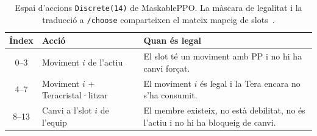 \begin{table}[htbp]
\centering
\caption{Espai d'accions \texttt{Discrete(14)} de MaskablePPO. La màscara de legalitat i la traducció a \texttt{/choose} comparteixen el mateix mapeig de slots~\cite{huang_action_masking}.}
\label{tab:ppo_actions}
\small
\begin{tabularx}{\textwidth}{clX}
\toprule
\textbf{Índex} & \textbf{Acció} & \textbf{Quan és legal} \\
\midrule
0--3 & Moviment $i$ de l'actiu & El slot té un moviment amb PP i no hi ha canvi forçat. \\
4--7 & Moviment $i$ + Teracristal·litzar & El moviment $i$ és legal i la Tera encara no s'ha consumit. \\
8--13 & Canvi a l'slot $i$ de l'equip & El membre existeix, no està debilitat, no és l'actiu i no hi ha bloqueig de canvi. \\
\bottomrule
\end{tabularx}
\end{table}
